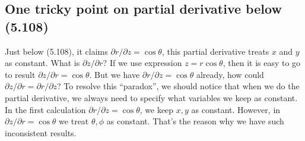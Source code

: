 \documentclass[10pt]{article}
\begin{document}
\subsection{One tricky point on partial derivative below (5.108)}

Just below (5.108), it claims $\partial r / \partial z = \cos{\theta}$, this partial derivative treats $x$ and $y$ as constant. What is $\partial z / \partial r$? If we use expression $z = r \cos{\theta}$, then it is easy to go to result $\partial z / \partial r = \cos{\theta}$. But we have $\partial r / \partial z = \cos{\theta}$ already, how could $\partial z / \partial r = \partial r / \partial z$?
To resolve this ``paradox'', we should notice that when we do the partial derivative, we always need to specify what variables we keep as constant. In the first calculation $\partial r / \partial z = \cos{\theta}$, we keep $x, y$ as constant. However, in $\partial z / \partial r = \cos{\theta}$ we treat $\theta, \phi$ as constant. That's the reason why we have such inconsistent results.
\end{document}
